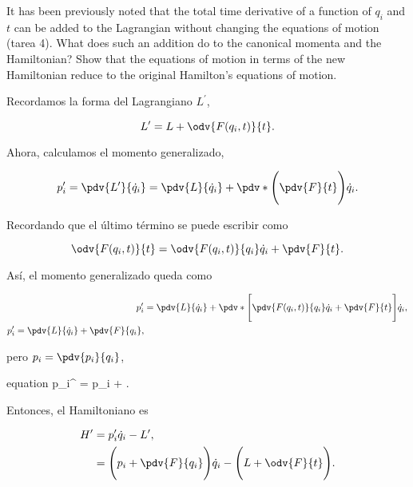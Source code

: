 \documentclass[../main.tex]{subfiles}
\begin{document}
\begin{problema}
	It has been previously noted that the total time derivative of a function
	of \(q_{i}\) and \(t\) can be added to the Lagrangian without changing the
	equations of motion (tarea 4). What does such an addition do to the canonical
	momenta and the Hamiltonian? Show that the equations of motion in terms of
	the new Hamiltonian reduce to the original Hamilton's equations of motion.

	\startsolution

	Recordamos la forma del Lagrangiano \(L^{\prime}\),

	\begin{equation*}
		L^{\prime} = L + \odv{F(q_{i}, t)}{t}.
	\end{equation*}

	Ahora, calculamos el momento generalizado,

	\begin{equation}
		p_{i}^{\prime} = \pdv{L^{\prime}}{\dot{q}_{i}} = \pdv{L}{\dot{q}_{i}} +
		\pdv*{\Biggl(\pdv{F}{t}\Biggr)}{\dot{q}_{i}}.
	\end{equation}

	Recordando que el último término se puede escribir como

	\begin{equation}
		\odv{F(q_{i}, t)}{t} = \odv{F(q_{i}, t)}{q_{i}} \dot{q}_{i} + \pdv{F}{t}.
		\label{eq:dt-F}
	\end{equation}

	Así, el momento generalizado queda como

	\begin{align*}
		p_{i}^{\prime} & = \pdv{L}{\dot{q}_{i}} + \pdv*{\Biggl[\pdv{F(q_{i}, t)}{q_{i}} \dot{q}_{i} + \pdv{F}{t}\Biggr]}{\dot{q}_{i}},\nonumber \\
		p_{i}^{\prime} = \pdv{L}{\dot{q}_{i}} + \pdv{F}{q_{i}},
	\end{align*}

	pero \(p_{i} = \pdv{p_{i}}{q_{i}}\),

	\begin{empheq}[box = \mainresult]{equation}
		p_{i}^{\prime} = p_{i} + .
		\label{eq:prime-conjugate-momenta}
	\end{empheq}

	Entonces, el Hamiltoniano es

	\begin{align*}
		H^{\prime} & = p_{i}^{\prime} \dot{q}_{i} - L^{\prime},                                        \\
		           & = \Biggl(p_{i} + \pdv{F}{q_{i}}\Biggr)\dot{q}_{i} - \Biggl(L + \odv{F}{t}\Biggr).
	\end{align*}


\end{problema}
\end{document}
